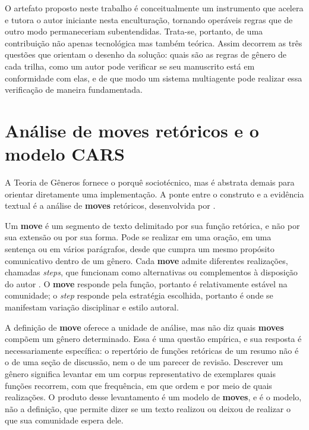 
O artefato proposto neste trabalho é conceitualmente um instrumento que acelera e tutora o autor iniciante nesta enculturação, tornando operáveis regras que de outro modo permaneceriam subentendidas. Trata-se, portanto, de uma contribuição  não apenas tecnológica mas também teórica. Assim decorrem as três questões que orientam o desenho da solução: quais são as regras de gênero de cada trilha, como um autor pode verificar se seu manuscrito está em conformidade com elas, e de que modo um sistema multiagente pode realizar essa verificação de maneira fundamentada.

\section{Análise de moves retóricos e o modelo CARS}

A Teoria de Gêneros fornece o porquê sociotécnico, mas é abstrata demais para orientar diretamente uma implementação. A ponte entre o construto e a evidência textual é a análise de \textbf{moves} retóricos,
desenvolvida por \cite{GenreAnalysis}.

Um \textbf{move} é um segmento de texto delimitado por sua função retórica, e não por sua extensão ou por sua forma. Pode se realizar em uma oração, em uma sentença ou em vários parágrafos, desde que cumpra um mesmo propósito comunicativo dentro de um gênero. Cada \textbf{move} admite diferentes realizações, chamadas \textit{steps}, que funcionam como alternativas ou complementos à disposição do autor \cite{ResearchGenres}. O \textbf{move} responde pela função, portanto é relativamente estável na comunidade; o \textit{step} responde pela estratégia escolhida, portanto é onde se manifestam variação disciplinar e estilo autoral.

A definição de \textbf{move} oferece a unidade de análise, mas não diz quais \textbf{moves} compõem um gênero determinado. Essa é uma questão empírica, e sua resposta é necessariamente específica: o repertório de funções retóricas de  um resumo não é o de uma seção de discussão, nem o de um parecer de revisão. Descrever um gênero significa levantar em um corpus representativo de exemplares quais funções recorrem, com que frequência, em que ordem e por meio de quais realizações. O produto desse levantamento é um modelo de \textbf{moves}, e é o modelo, não a definição, que permite dizer se um texto realizou ou deixou de realizar o que sua comunidade espera dele.

